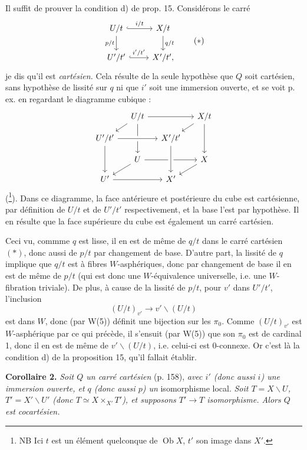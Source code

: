 \documentclass[11pt]{article}
\newcommand{\printedpage}[1]{\marginpar{\footnotesize p.~#1}}
\newcommand{\msp}[1]{\marginpar{\footnotesize [#1]}}
\newcommand{\Ob}{\operatorname{Ob}}
\begin{document}
Il suffit de prouver la condition d) de prop. 15. Considérons le carré
\[
\begin{tikzcd}
U/t \ar[r, hook, "i/t"] \ar[d, "p/t"'] & X/t \ar[d, "q/t"] \\
U'/t' \ar[r, hook, "i'/t'"] & X'/t',
\end{tikzcd}
\tag*{$(*)$}
\]
je dis qu'il est \textit{cartésien.} Cela résulte de la seule hypothèse que $Q$ soit cartésien, sans hypothèse de lissité sur $q$ ni que $i'$ soit une immersion ouverte, et se voit p. ex. en regardant le diagramme cubique :
\printedpage{110}
\[
\begin{tikzcd}[row sep=small, column sep=small]
& U/t \ar[rr] \ar[dl] \ar[dd] & & X/t \ar[dl] \ar[dd] \\
U'/t' \ar[rr, crossing over] \ar[dd] & & X'/t' & \\
& U \ar[rr] \ar[dl] & & X \ar[dl] \\
U' \ar[rr] & & X' \ar[from=uu, crossing over] &
\end{tikzcd}
\]
(\footnote[110]{NB Ici $t$ est un élément quelconque de $\Ob X$, $t'$ son image dans $X'$.}). Dans ce diagramme, la face antérieure et postérieure du cube est cartésienne, par définition de $U/t$ et de $U'/t'$
\msp{page 160}
respectivement, et la base l'est par hypothèse. Il en résulte que la face supérieure du cube est également un carré cartésien.

Ceci vu, commme $q$ est lisse, il en est de même de $q/t$ dans le carré cartésien $(*)$, donc aussi de $p/t$ par changement de base. D'autre part, la lissité de $q$ implique que $q/t$ est à fibres $W$-asphériques, donc par changement de base il en est de même de $p/t$ (qui est donc une $W$-équivalence universelle, i.e. une $W$-fibration triviale). De plus, à cause de la lissité de $p/t$, pour $v'$ dans $U'/t'$, l'inclusion %
\[
(U/t)_{v'} \longrightarrow v' \backslash (U/t)
\]
est dans $W$, donc (par W(5)) définit une bijection sur les $\pi_0$. Comme $(U/t)_{v'}$ est $W$-asphérique par ce qui précède, il s'ensuit (par W(5)) que son $\pi_0$ est de cardinal 1, donc il en est de même de $v' \backslash (U/t)$, i.e. celui-ci est 0-connexe. Or c'est là la condition d) de la proposition 15, qu'il fallait établir.

\msp{page 161}
\textbf{Corollaire 2.} \textit{Soit $Q$ un carré cartésien} (p. 158), \textit{avec $i'$ (donc aussi $i$) une immersion ouverte, et $q$ (donc aussi $p$) un} isomorphisme local. \textit{Soit $T = X \backslash U$, $T' = X' \backslash U'$ (donc $T \simeq X \times_{X'} T'$), et supposons $T' \longrightarrow T$ isomorphisme. Alors $Q$ est cocartésien.}
\end{document}
